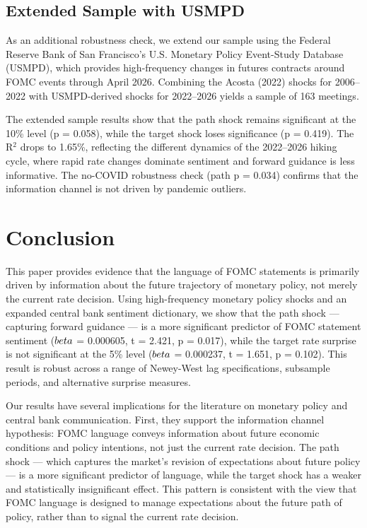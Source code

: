 \documentclass[12pt]{article}
\begin{document}
\subsection{Extended Sample with USMPD}

As an additional robustness check, we extend our sample using the Federal Reserve Bank of San Francisco's U.S. Monetary Policy Event-Study Database (USMPD), which provides high-frequency changes in futures contracts around FOMC events through April 2026. Combining the Acosta (2022) shocks for 2006--2022 with USMPD-derived shocks for 2022--2026 yields a sample of 163 meetings.

The extended sample results show that the path shock remains significant at the 10\% level (p = 0.058), while the target shock loses significance (p = 0.419). The R$^2$ drops to 1.65\%, reflecting the different dynamics of the 2022--2026 hiking cycle, where rapid rate changes dominate sentiment and forward guidance is less informative. The no-COVID robustness check (path p = 0.034) confirms that the information channel is not driven by pandemic outliers.


\section{Conclusion}

This paper provides evidence that the language of FOMC statements is primarily driven by information about the future trajectory of monetary policy, not merely the current rate decision. Using high-frequency monetary policy shocks and an expanded central bank sentiment dictionary, we show that the path shock --- capturing forward guidance --- is a more significant predictor of FOMC statement sentiment ($\\beta$ = 0.000605, t = 2.421, p = 0.017), while the target rate surprise is not significant at the 5\% level ($\\beta$ = 0.000237, t = 1.651, p = 0.102). This result is robust across a range of Newey-West lag specifications, subsample periods, and alternative surprise measures.

Our results have several implications for the literature on monetary policy and central bank communication. First, they support the information channel hypothesis: FOMC language conveys information about future economic conditions and policy intentions, not just the current rate decision. The path shock --- which captures the market's revision of expectations about future policy --- is a more significant predictor of language, while the target shock has a weaker and statistically insignificant effect. This pattern is consistent with the view that FOMC language is designed to manage expectations about the future path of policy, rather than to signal the current rate decision.
\end{document}
